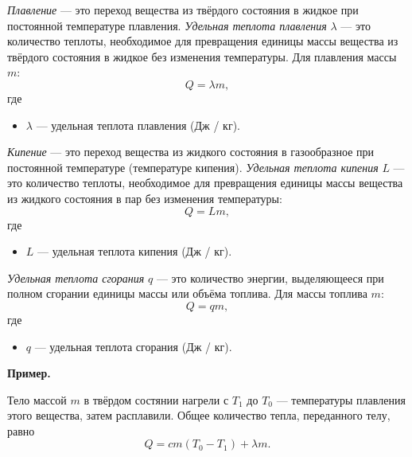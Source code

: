 \documentclass[12pt, a4paper]{article}%
\begin{document}
\textit{Плавление} — это переход вещества из твёрдого состояния в жидкое при постоянной температуре плавления. \textit{Удельная теплота плавления} $\lambda$ — это количество теплоты, необходимое для превращения единицы массы вещества из твёрдого состояния в жидкое без изменения температуры. Для плавления массы $m$:
\[
Q = \lambda m,
\]
где
\begin{itemize}
  \item $\lambda$ — удельная теплота плавления (Дж / кг).
\end{itemize}

\textit{Кипение} — это переход вещества из жидкого состояния в газообразное при постоянной температуре (температуре кипения). \textit{Удельная теплота кипения} $L$ — это количество теплоты, необходимое для превращения единицы массы вещества из жидкого состояния в пар без изменения температуры:
\[
Q = Lm,
\]
где
\begin{itemize}
  \item $L$ — удельная теплота кипения (Дж / кг).
\end{itemize}

\textit{Удельная теплота сгорания} $q$ — это количество энергии, выделяющееся при полном сгорании единицы массы или объёма топлива. Для массы топлива $m$:
\[
Q = qm,
\]
где
\begin{itemize}
  \item $q$ — удельная теплота сгорания (Дж / кг).
\end{itemize}

\textbf{Пример.} 

Тело массой $m$ в твёрдом состянии нагрели с $T_1$ до $T_0$ --- температуры плавления этого вещества, затем расплавили. Общее количество тепла, переданного телу, равно
\[
Q = cm(T_0 - T_1) + \lambda m.
\]
\end{document}
